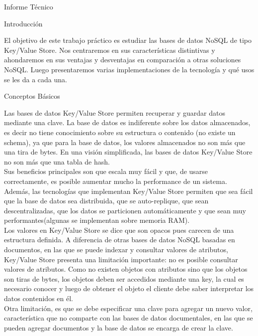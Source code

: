 \begin{section}{Informe T\'ecnico}

\begin{subsection}{Introducci\'on}

El objetivo de este trabajo práctico es estudiar las bases de datos NoSQL de tipo Key/Value Store. Nos centraremos en sus características distintivas y ahondaremos en sus ventajas y desventajas en comparación a otras soluciones NoSQL. Luego presentaremos varias implementaciones de la tecnología y qué usos se les da a cada una.

\end{subsection}

\begin{subsection}{Conceptos Básicos}

Las bases de datos Key/Value Store permiten recuperar y guardar datos mediante una clave. La base de datos es indiferente sobre los datos almacenados, es decir no tiene conocimiento sobre su estructura o contenido (no existe un schema), ya que para la base de datos, los valores almacenados no son más que una tira de bytes. En una visión simplificada, las bases de datos Key/Value Store no son más que una tabla de hash. \\

Sus beneficios principales son que escala muy fácil y que, de usarse correctamente, es posible aumentar mucho la performance de un sistema. Además, las tecnologías que implementan Key/Value Store permiten que sea fácil que la base de datos sea distribuida, que se auto-replique, que sean descentralizadas, que los datos se particionen automáticamente y que sean muy performantes(algunas se implementan sobre memoria RAM).\\

Los valores en Key/Value Store se dice que son opacos pues carecen de una estructura definida. A diferencia de otras bases de datos NoSQL basadas en documentos, en las que se puede indexar y consultar valores de atributos, Key/Value Store presenta una limitación importante: no es posible consultar valores de atributos. Como no existen objetos con atributos sino que los objetos son tiras de bytes, los objetos deben ser accedidos mediante una key, la cual es necesario conocer y luego de obtener el objeto el cliente debe saber interpretar los datos contenidos en él.\\

Otra limitación, es que se debe especificar una clave para agregar un nuevo valor, característica que no comparte con las bases de datos documentales, en las que se pueden agregar documentos y la base de datos se encarga de crear la clave.\\


\end{subsection}
\end{section}
